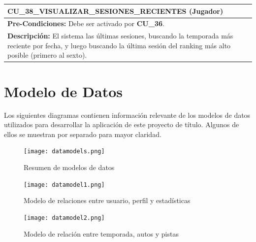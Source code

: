 \begin{center}
  \begin{tabular}{| p{7.5cm} | p{7.5cm} |}
    \hline
    \multicolumn{2}{|p{15cm}|}{\textbf{CU\_38\_VISUALIZAR\_SESIONES\_RECIENTES} (Jugador)} \\ \hline
    \multicolumn{2}{|p{15cm}|}{\textbf{Pre-Condiciones:} Debe ser activado por \textbf{CU\_36}.} \\ \hline
    \multicolumn{2}{|p{15cm}|}{\textbf{Descripción:} El sistema las últimas sesiones, buscando la temporada más reciente por fecha, y luego buscando la última sesión del ranking más alto posible (primero al sexto).} \\
    \hline
  \end{tabular}
  
  \label{table:usecase:38}
\end{center}

\section{Modelo de Datos}
Los siguientes diagramas contienen información relevante de los modelos de datos utilizados para desarrollar la aplicación de este proyecto de título. Algunos de ellos se muestran por separado para mayor claridad.

\begin{figure}[H]
  \begin{center}
    \texttt{[image: datamodels.png]}
  \end{center}
  \caption[Resumen de modelo de datos]{Resumen de modelos de datos}
  \label{fig:datamodels}
\end{figure}

\begin{figure}[H]
  \begin{center}
    \texttt{[image: datamodel1.png]}
  \end{center}
  \caption[Modelo de relaciones entre usuario, perfil y estadísticas]{Modelo de relaciones entre usuario, perfil y estadísticas}
  \label{fig:datamodels1}
\end{figure}

\begin{figure}[H]
  \begin{center}
    \texttt{[image: datamodel2.png]}
  \end{center}
  \caption[Modelo de relación entre temporada, autos y pistas]{Modelo de relación entre temporada, autos y pistas}
  \label{fig:datamodels2}
\end{figure}


